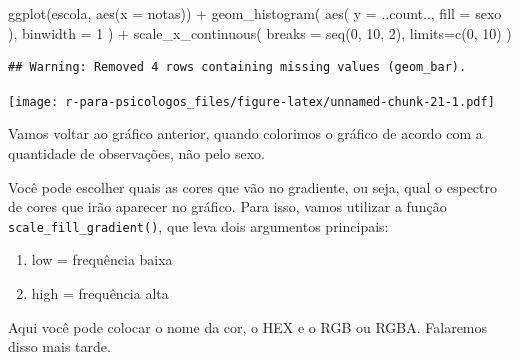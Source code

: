 \documentclass[
]{book}
\newenvironment{Shaded}{\begin{snugshade}}{\end{snugshade}}
\newcommand{\AttributeTok}[1]{\textcolor[rgb]{0.77,0.63,0.00}{#1}}
\newcommand{\DecValTok}[1]{\textcolor[rgb]{0.00,0.00,0.81}{#1}}
\newcommand{\FunctionTok}[1]{\textcolor[rgb]{0.00,0.00,0.00}{#1}}
\newcommand{\NormalTok}[1]{#1}
\newcommand{\SpecialCharTok}[1]{\textcolor[rgb]{0.00,0.00,0.00}{#1}}
\providecommand{\tightlist}{%
  \setlength{\itemsep}{0pt}\setlength{\parskip}{0pt}}
\begin{document}
\begin{Shaded}
\begin{Highlighting}[]
\FunctionTok{ggplot}\NormalTok{(escola, }\FunctionTok{aes}\NormalTok{(}\AttributeTok{x =}\NormalTok{ notas)) }\SpecialCharTok{+} 
  \FunctionTok{geom\_histogram}\NormalTok{(}
    \FunctionTok{aes}\NormalTok{(}
      \AttributeTok{y =}\NormalTok{ ..count..,}
      \AttributeTok{fill =}\NormalTok{ sexo}
\NormalTok{      ),}
    \AttributeTok{binwidth =} \DecValTok{1}
\NormalTok{  ) }\SpecialCharTok{+}
  \FunctionTok{scale\_x\_continuous}\NormalTok{(}
    \AttributeTok{breaks =} \FunctionTok{seq}\NormalTok{(}\DecValTok{0}\NormalTok{, }\DecValTok{10}\NormalTok{, }\DecValTok{2}\NormalTok{),}
    \AttributeTok{limits=}\FunctionTok{c}\NormalTok{(}\DecValTok{0}\NormalTok{, }\DecValTok{10}\NormalTok{)}
\NormalTok{  )}
\end{Highlighting}
\end{Shaded}

\begin{verbatim}
## Warning: Removed 4 rows containing missing values (geom_bar).
\end{verbatim}

\texttt{[image: r-para-psicologos\_files/figure-latex/unnamed-chunk-21-1.pdf]}

Vamos voltar ao gráfico anterior, quando colorimos o gráfico de acordo com a quantidade de observações, não pelo sexo.

Você pode escolher quais as cores que vão no gradiente, ou seja, qual o espectro de cores que irão aparecer no gráfico. Para isso, vamos utilizar a função \texttt{scale\_fill\_gradient()}, que leva dois argumentos principais:

\begin{enumerate}
\def\labelenumi{\arabic{enumi}.}
\tightlist
\item
  low = frequência baixa
\item
  high = frequência alta
\end{enumerate}

Aqui você pode colocar o nome da cor, o HEX e o RGB ou RGBA. Falaremos disso mais tarde.
\end{document}
